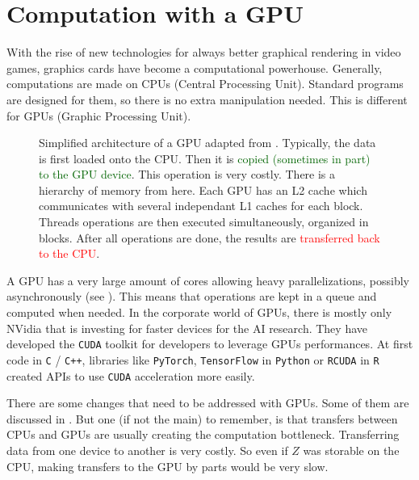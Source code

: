 \documentclass[../main.tex]{subfiles}
\begin{document}
\section{Computation with a GPU}
\label{sec:exploiting_the_power_of_the_graphic_card}
With the rise of new technologies for always better graphical rendering in
video games, graphics cards have become a computational powerhouse.
Generally, computations are made on CPUs (Central Processing Unit).
Standard programs are designed for them, so there is no extra manipulation
needed.
This is different for GPUs (Graphic Processing Unit).
\begin{figure}[h]
    \centering
    \def\svgscale{0.35}
    
    \caption{Simplified architecture of a GPU adapted from \citep[chapter 2]{feydy2020fast}.
    Typically, the data is first loaded onto the CPU.
    Then it is \textcolor{darkgreen}{copied (sometimes in part) to the GPU device}.
    This operation is very costly.
    There is a hierarchy of memory from here.
    Each GPU has an L2 cache which communicates with several independant L1
    caches for each block.
    Threads operations are then executed simultaneously, organized in blocks.
    After all operations are done,
    the results are \textcolor{red}{transferred back to the CPU}.
    }
    \label{fig:GPU_intro}
\end{figure}

A GPU has a very large amount of cores allowing heavy parallelizations,
possibly asynchronously (see ).
This means that operations are kept in a queue and computed when needed.
In the corporate world of GPUs, there is mostly only NVidia that is
investing for faster devices for the AI research.
They have developed the \texttt{CUDA} toolkit for developers to leverage GPUs
performances.
At first code in \texttt{C} / \texttt{C++}, libraries like \texttt{PyTorch},
\texttt{TensorFlow} in \texttt{Python} or \texttt{RCUDA} in \texttt{R}
created APIs to use \texttt{CUDA} acceleration more easily.

\medskip

There are some changes that need to be addressed with GPUs.
Some of them are discussed in .
But one (if not the main) to remember, is that transfers between CPUs and GPUs
are usually creating the computation bottleneck.
Transferring data from one device to another is very costly.
So even if $Z$ was storable on the CPU, making transfers to the GPU by parts
would be very slow.
\end{document}
